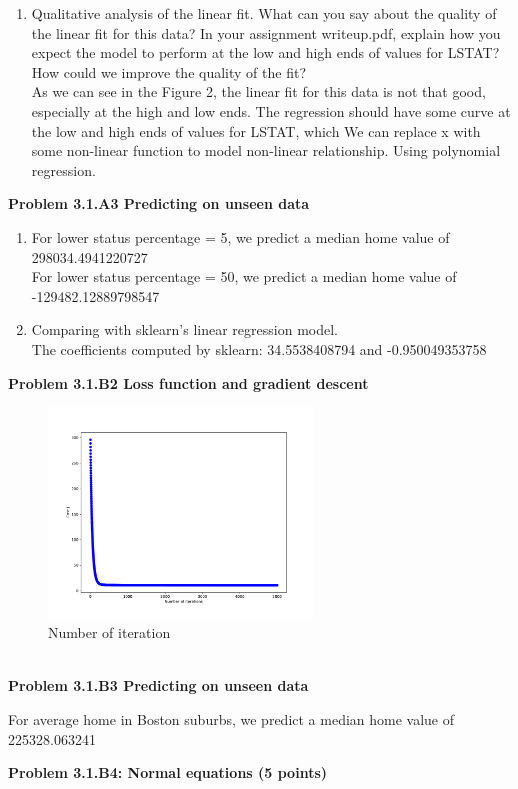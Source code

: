 \documentclass[]{book}
\theoremstyle{definition}
\begin{document}
\begin{enumerate}
	\item Qualitative analysis of the linear fit. What can you say about the quality of the linear fit for this data? In your assignment writeup.pdf, explain how you expect the model to perform at the low and high ends of values for LSTAT? How could we improve the quality of the fit?\\
	As we can see in the Figure 2, the linear fit for this data is not that good, especially at the high and low ends. The regression should have some curve at the low and high ends of values for LSTAT, which We can replace x with some non-linear function to model non-linear relationship. Using polynomial regression.
\end{enumerate}
\textbf{Problem 3.1.A3 Predicting on unseen data}
\begin{enumerate}
	\item For lower status percentage = 5, we predict a median home value of 298034.4941220727\\
	For lower status percentage = 50, we predict a median home value of -129482.12889798547
	\item Comparing with sklearn's linear regression model.\\
	The coefficients computed by sklearn:  34.5538408794  and  -0.950049353758
\end{enumerate}
\textbf{Problem 3.1.B2 Loss function and gradient descent}\\
\begin{figure}[h]
	\centering
	\includegraphics[width=7cm]{fig5.pdf}
	\caption{Number of iteration}
	\label{fig:4}
\end{figure}
\\
\textbf{Problem 3.1.B3 Predicting on unseen data}
\begin{flushleft}
	For average home in Boston suburbs, we predict a median home value of 225328.063241
\end{flushleft}
\textbf{Problem 3.1.B4: Normal equations (5 points)}
\end{document}
